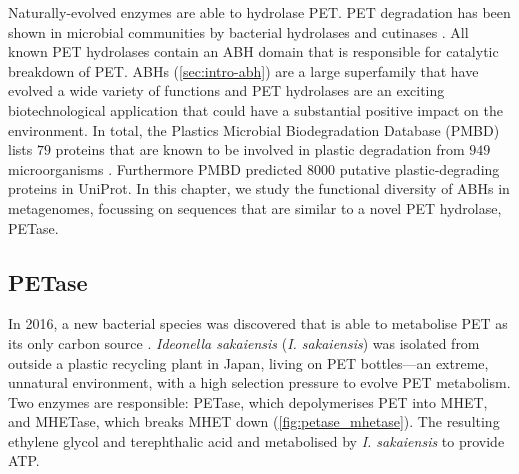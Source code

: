 Naturally-evolved enzymes are able to hydrolase PET. PET degradation has been shown in microbial communities \cite{Sharon2013} by bacterial hydrolases \cite{Muller2005} and cutinases \cite{Ronkvist2009,Vertommen2005}. All known PET hydrolases contain an ABH domain that is responsible for catalytic breakdown of PET. ABHs (\ref{sec:intro-abh}) are a large superfamily that have evolved a wide variety of functions and PET hydrolases are an exciting biotechnological application that could have a substantial positive impact on the environment.
In total, the Plastics Microbial Biodegradation Database (PMBD) lists $79$ proteins that are known to be involved in plastic degradation from $949$ microorganisms \cite{Gan2019}.
Furthermore PMBD predicted \num{8000} putative plastic-degrading proteins in UniProt.
In this chapter, we study the functional diversity of ABHs in metagenomes, focussing on sequences that are similar to a novel PET hydrolase, PETase.

\subsection{PETase}

In 2016, a new bacterial species was discovered that is able to metabolise PET as its only carbon source \cite{Yoshida2016,Bornscheuer2016}. \emph{Ideonella sakaiensis} (\emph{I. sakaiensis}) was isolated from outside a plastic recycling plant in Japan, living on PET bottles---an extreme, unnatural environment, with a high selection pressure to evolve PET metabolism. Two enzymes are responsible: PETase, which depolymerises PET into MHET, and MHETase, which breaks MHET down (\ref{fig:petase_mhetase}). The resulting ethylene glycol and terephthalic acid and metabolised by \emph{I. sakaiensis} to provide ATP.

